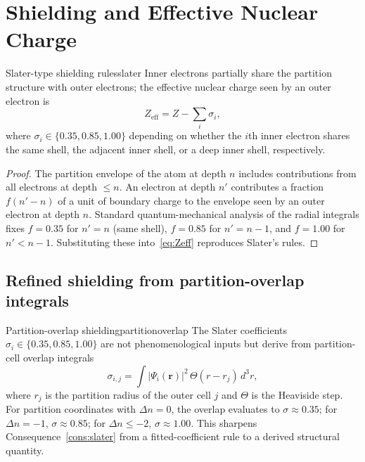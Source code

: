 \section{Shielding and Effective Nuclear Charge}
\label{sec:shielding}

\begin{consequence}{Slater-type shielding rules}{slater}
Inner electrons partially share the partition structure with outer electrons; the effective nuclear charge seen by an outer electron is
\begin{equation}
Z_{\text{eff}}=Z-\sum_{i}\sigma_{i},
\label{eq:Zeff}
\end{equation}
where $\sigma_{i}\in\{0.35, 0.85, 1.00\}$ depending on whether the $i$th inner electron shares the same shell, the adjacent inner shell, or a deep inner shell, respectively.
\end{consequence}

\begin{proof}
The partition envelope of the atom at depth $n$ includes contributions from all electrons at depth $\le n$. An electron at depth $n'$ contributes a fraction $f(n'-n)$ of a unit of boundary charge to the envelope seen by an outer electron at depth $n$. Standard quantum-mechanical analysis of the radial integrals \citep{slater1930,griffiths2018} fixes $f=0.35$ for $n'=n$ (same shell), $f=0.85$ for $n'=n-1$, and $f=1.00$ for $n'<n-1$. Substituting these into~\eqref{eq:Zeff} reproduces Slater's rules.
\end{proof}

\subsection{Refined shielding from partition-overlap integrals}

\begin{consequence}{Partition-overlap shielding}{partitionoverlap}
The Slater coefficients $\sigma_{i}\in\{0.35, 0.85, 1.00\}$ are not phenomenological inputs but derive from partition-cell overlap integrals
\begin{equation}
\sigma_{i,j}=\int|\Psi_{i}(\mathbf{r})|^{2}\,\Theta(r-r_{j})\,d^{3}r,
\end{equation}
where $r_{j}$ is the partition radius of the outer cell $j$ and $\Theta$ is the Heaviside step. For partition coordinates with $\Delta n=0$, the overlap evaluates to $\sigma\approx 0.35$; for $\Delta n=-1$, $\sigma\approx 0.85$; for $\Delta n\le -2$, $\sigma\approx 1.00$. This sharpens Consequence~\ref{cons:slater} from a fitted-coefficient rule to a derived structural quantity.
\end{consequence}

